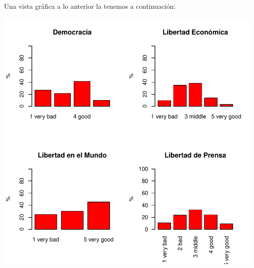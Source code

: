 \documentclass{article}
\begin{document}
Una vista gráfica a lo anterior la tenemos a continuación:

\includegraphics{paperVersion_1-barplots}
\end{document}
